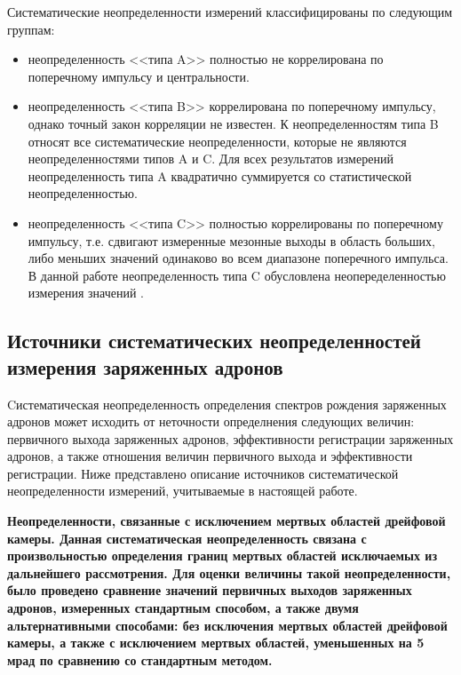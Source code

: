 Систематические неопределенности измерений классифицированы по следующим группам:
\begin{itemize}
	\item неопределенность <<типа A>> полностью не коррелирована по поперечному импульсу и центральности. 
	\item неопределенность <<типа B>> коррелирована по поперечному импульсу, однако точный закон корреляции не известен. К неопределенностям типа B относят все систематические неопределенности, которые не являются неопределенностями типов A и C. Для всех результатов измерений неопределенность типа A квадратично суммируется со статистической неопределенностью.
	\item неопределенность <<типа C>> полностью коррелированы по поперечному импульсу, т.е. сдвигают измеренные мезонные выходы в область больших, либо меньших значений одинаково во всем диапазоне поперечного импульса. В данной работе неопределенность типа C обусловлена неопеределенностью измерения значений \Ncoll.
\end{itemize}

\subsection{Источники систематических неопределенностей измерения заряженных адронов} \label{sect3:SystSource}
Cистематическая неопределенность определения спектров рождения заряженных адронов может исходить от неточности определнения следующих величин: первичного выхода заряженных адронов, эффективности регистрации заряженных адронов, а также отношения величин первичного выхода и эффективности регистрации. Ниже представлено описание источников систематической неопределенности измерений, учитываемые в настоящей работе. 

\bfseries Неопределенности, связанные с исключением мертвых областей дрейфовой камеры.
\mdseries
Данная систематическая неопределенность связана с произвольностью определения границ мертвых областей исключаемых из дальнейшего рассмотрения. Для оценки величины такой неопределенности, было проведено сравнение значений первичных выходов заряженных адронов, измеренных стандартным способом, а также двумя альтернативными способами: без  исключения мертвых областей дрейфовой камеры, а также с исключением мертвых областей, уменьшенных на 5 мрад по сравнению со стандартным методом.


